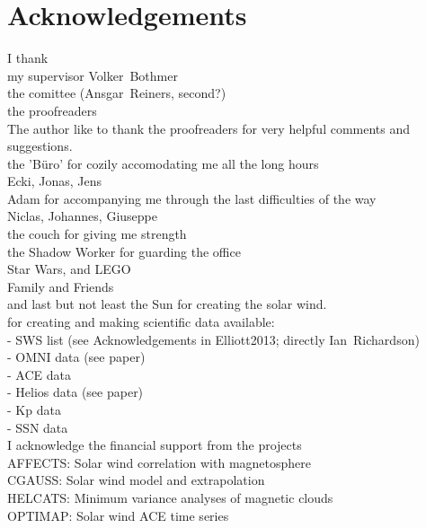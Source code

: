 
\chapter*{Acknowledgements}

I thank\\
my supervisor Volker~Bothmer\\
the comittee (Ansgar~Reiners, second?)\\
the proofreaders\\
The author like to thank the proofreaders for very helpful comments and suggestions.\\
the 'Büro' for cozily accomodating me all the long hours\\

Ecki, Jonas, Jens\\
Adam for accompanying me through the last difficulties of the way\\
Niclas, Johannes, Giuseppe\\
the couch for giving me strength\\
the Shadow Worker for guarding the office\\
Star Wars, and LEGO\\
Family and Friends\\
and last but not least the Sun for creating the solar wind.\\

for creating and making scientific data available:\\
- SWS list (see Acknowledgements in Elliott2013; directly Ian~Richardson)\\
- OMNI data (see paper)\\
- ACE data\\
- Helios data (see paper)\\
- Kp data\\
- SSN data\\

I acknowledge the financial support from the projects\\
AFFECTS: Solar wind correlation with magnetosphere\\
CGAUSS: Solar wind model and extrapolation\\
HELCATS: Minimum variance analyses of magnetic clouds\\
OPTIMAP: Solar wind ACE time series\\


